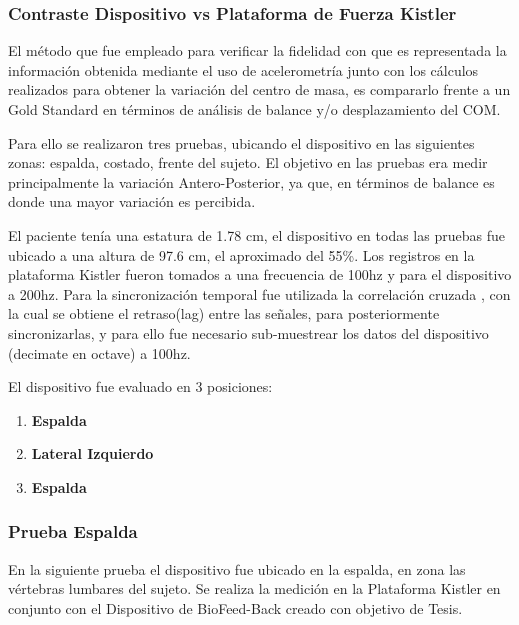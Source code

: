 \documentclass[12pt,a4paper]{article}
\newcommand{\nombreDispositivo}{Dispositivo de BioFeed-Back }
\begin{document}
\subsubsection{Contraste Dispositivo vs Plataforma de Fuerza Kistler}

El método que fue empleado para verificar la fidelidad con que es representada la información obtenida mediante el uso de acelerometría junto con los cálculos realizados para obtener la variación del centro de masa, es compararlo frente a un Gold Standard en términos de análisis de balance y/o desplazamiento del COM.

Para ello se realizaron tres pruebas, ubicando el dispositivo en las siguientes zonas: espalda, costado, frente del sujeto.
El objetivo en las pruebas era medir principalmente la variación Antero-Posterior, ya que, en términos de balance es donde una mayor variación es percibida.

El paciente tenía una estatura de 1.78 cm, el dispositivo en todas las pruebas fue ubicado a una altura de 97.6 cm, el aproximado del 55\%.
Los registros en la plataforma Kistler fueron tomados a una frecuencia de 100hz y para el dispositivo a 200hz. 
Para la sincronización temporal fue utilizada la correlación cruzada \cite{correlacionCruzada}, con la cual se obtiene el retraso(lag) entre las señales, para posteriormente sincronizarlas, y para ello fue necesario sub-muestrear los datos del dispositivo (decimate en octave) a 100hz.

El dispositivo fue evaluado en 3 posiciones:
\begin{enumerate}
	\item \textbf{Espalda} 
	\item \textbf{Lateral Izquierdo}
	\item \textbf{Espalda}
\end{enumerate}

\newpage
\subsubsection{Prueba Espalda} En la siguiente prueba el dispositivo fue ubicado en la espalda, en zona las vértebras lumbares del sujeto. Se realiza la medición en la Plataforma Kistler en conjunto con el \nombreDispositivo creado con objetivo de Tesis.
		
\end{document}
